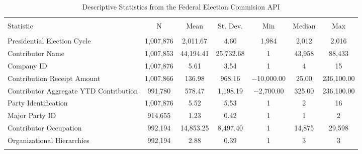 
\begin{table}[!htbp] \centering 
  \caption{Descriptive Statistics from the Federal Election Commision API} 
  \label{} 
\scriptsize 
\begin{tabular}{@{\extracolsep{5pt}}lcccccc} 
\\[-1.8ex]\hline 
\hline \\[-1.8ex] 
Statistic & \multicolumn{1}{c}{N} & \multicolumn{1}{c}{Mean} & \multicolumn{1}{c}{St. Dev.} & \multicolumn{1}{c}{Min} & \multicolumn{1}{c}{Median} & \multicolumn{1}{c}{Max} \\ 
\hline \\[-1.8ex] 
Presidential Election Cycle & 1,007,876 & 2,011.67 & 4.60 & 1,984 & 2,012 & 2,016 \\ 
Contributor Name & 1,007,853 & 44,194.41 & 25,732.68 & 1 & 43,958 & 88,433 \\ 
Company ID & 1,007,876 & 5.61 & 3.54 & 1 & 4 & 15 \\ 
Contribution Receipt Amount & 1,007,866 & 136.98 & 968.16 & $-$10,000.00 & 25.00 & 236,100.00 \\ 
Contributor Aggregate YTD Contribution & 991,780 & 578.47 & 1,198.19 & $-$2,700.00 & 325.00 & 236,100.00 \\ 
Party Identification & 1,007,876 & 5.52 & 5.53 & 1 & 2 & 16 \\ 
Major Party ID & 914,655 & 1.23 & 0.42 & 1 & 1 & 2 \\ 
Contributor Occupation & 992,194 & 14,853.25 & 8,497.40 & 1 & 14,875 & 29,598 \\ 
Organizational Hierarchies & 992,194 & 2.88 & 0.39 & 1 & 3 & 3 \\ 
\hline \\[-1.8ex] 
\end{tabular} 
\end{table}  
